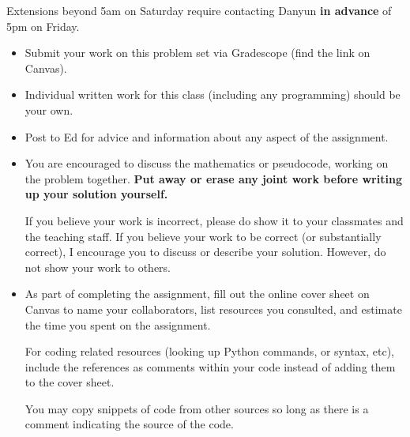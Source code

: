 \documentclass[12pt,letterpaper,noanswers]{exam}
\begin{document}
 \pdfpageheight 11in 
  \pdfpagewidth 8.5in

\noindent Extensions beyond 5am on Saturday require contacting Danyun \textbf{in advance} of 5pm on Friday. \\

\begin{itemize}
\item Submit your work on this problem set via Gradescope (find the link on Canvas).
\item Individual written work for this class (including any programming) should be your own.  
\item Post to Ed for advice and information about any aspect of the assignment.
\item You are encouraged to discuss the mathematics or pseudocode, working on the problem together.  \textbf{Put away or erase any joint work before writing up your solution yourself.}

If you believe your work is incorrect, please do show it to your classmates and the teaching staff.  If you believe your work to be correct (or substantially correct), I encourage you to discuss or describe your solution.  However, do not show your work to others.

\item As part of completing the assignment, fill out the online cover sheet on Canvas to name your collaborators, list resources you consulted, and estimate the time you spent on the assignment.

For coding related resources (looking up Python commands, or syntax, etc), include the references as comments within your code instead of adding them to the cover sheet.

You may copy snippets of code from other sources so long as there is a comment indicating the source of the code.
\end{itemize}
\end{document}
